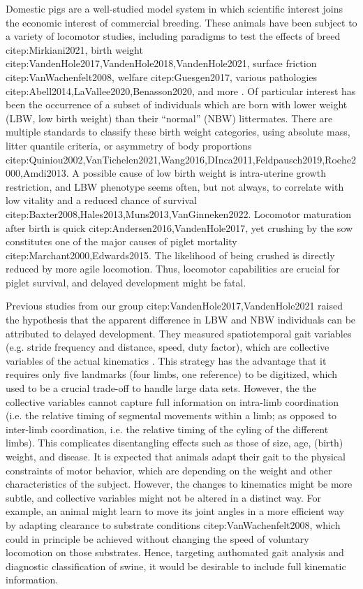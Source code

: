 \documentclass[10pt,a4paper]{article}
\begin{document}
Domestic pigs are a well-studied model system in which scientific interest joins the economic interest of commercial breeding.
These animals have been subject to a variety of locomotor studies, including paradigms to test the effects of breed citep:Mirkiani2021, birth weight citep:VandenHole2017,VandenHole2018,VandenHole2021, surface friction citep:VanWachenfelt2008, welfare citep:Guesgen2017, various pathologies citep:Abell2014,LaVallee2020,Benasson2020, and more \citep[\textit{cf.}][]{Netukova2021}.
Of particular interest has been the occurrence of a subset of individuals which are born with lower weight (LBW, low birth weight) than their ``normal'' (NBW) littermates.
There are multiple standards to classify these birth weight categories, using absolute mass, litter quantile criteria, or asymmetry of body proportions citep:Quiniou2002,VanTichelen2021,Wang2016,DInca2011,Feldpausch2019,Roehe2000,Amdi2013.
A possible cause of low birth weight is intra-uterine growth restriction, and LBW phenotype seems often, but not always, to correlate with low vitality and a reduced chance of survival citep:Baxter2008,Hales2013,Muns2013,VanGinneken2022.
Locomotor maturation after birth is quick citep:Andersen2016,VandenHole2017, yet crushing by the sow constitutes one of the major causes of piglet mortality citep:Marchant2000,Edwards2015.
The likelihood of being crushed is directly reduced by more agile locomotion.
Thus, locomotor capabilities are crucial for piglet survival, and delayed development might be fatal.

Previous studies from our group citep:VandenHole2017,VandenHole2021 raised the hypothesis that the apparent difference in LBW and NBW individuals can be attributed to delayed development.
They measured spatiotemporal gait variables (e.g. stride frequency and distance, speed, duty factor), which are collective variables of the actual kinematics \citep[\textit{cf.}][]{Newell2021,Nishikawa2007,Aerts2000}.
This strategy has the advantage that it requires only five landmarks (four limbs, one reference) to be digitized, which used to be a crucial trade-off to handle large data sets.
However, the the collective variables cannot capture full information on intra-limb coordination (i.e. the relative timing of segmental movements within a limb; as opposed to inter-limb coordination, i.e. the relative timing of the cyling of the different limbs).
This complicates disentangling effects such as those of size, age, (birth) weight, and disease.
It is expected that animals adapt their gait to the physical constraints of motor behavior, which are depending on the weight and other characteristics of the subject.
However, the changes to kinematics might be more subtle, and collective variables might not be altered in a distinct way.
For example, an animal might learn to move its joint angles in a more efficient way by adapting clearance to substrate conditions citep:VanWachenfelt2008, which could in principle be achieved without changing the speed of voluntary locomotion on those substrates.
Hence, targeting authomated gait analysis and diagnostic classification of swine, it would be desirable to include full kinematic information.
\end{document}
